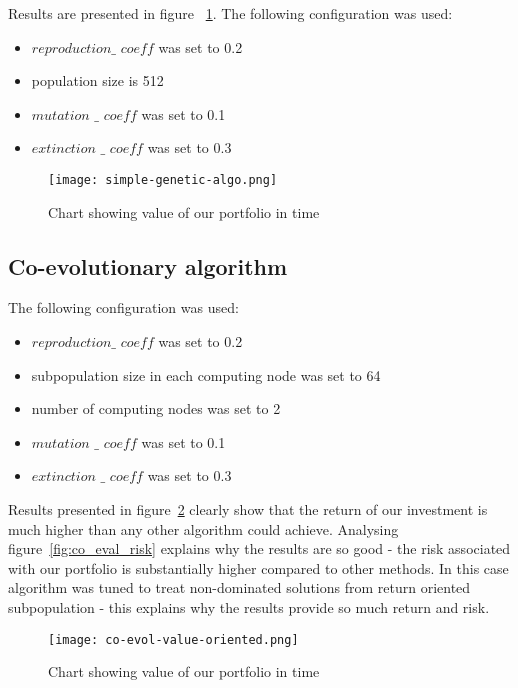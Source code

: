 Results are presented in figure ~\ref{fig:gen-algo}.
The following configuration was used:
\begin{itemize}
  \item $reproduction\_$ $coeff$ was set to 0.2
  \item population size is 512
  \item $mutation$ $\_$ $coeff$ was set to 0.1
  \item $extinction$ $\_$ $coeff$ was set to 0.3
\end{itemize}


\begin{figure}[ht]
  \begin{center}
    \texttt{[image: simple-genetic-algo.png]}
  \end{center}
  \caption{Chart showing value of our portfolio in time}
  \label{fig:gen-algo}
\end{figure}

\subsection{Co-evolutionary algorithm}
\label{sec:co-evol-2}

The following configuration was used:
\begin{itemize}
  \item $reproduction\_$ $coeff$ was set to 0.2
  \item subpopulation size in each computing node was set to 64
  \item number of computing nodes was set to 2
  \item $mutation$ $\_$ $coeff$ was set to 0.1
  \item $extinction$ $\_$ $coeff$ was set to 0.3
\end{itemize}

Results presented in figure~\ref{fig:co_eval_return} clearly show that the return of our investment is much higher than any other algorithm could achieve.  
Analysing figure~\ref{fig:co_eval_risk} explains why the results are so good - the risk associated with our portfolio is substantially higher compared to other methods.
In this case algorithm was tuned to treat non-dominated solutions from return oriented subpopulation - this explains why the results provide so much return and risk. 

\begin{figure}[ht]
  \begin{center}
    \texttt{[image: co-evol-value-oriented.png]}
  \end{center}
  \caption{Chart showing value of our portfolio in time}
  \label{fig:co_eval_return}
\end{figure}

